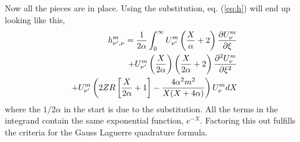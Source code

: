 \documentclass[13pt,a4paper]{article}
\begin{document}
    Now all the pieces are in place. Using the substitution, eq. (\ref{eq:h})
    will end up looking like this,
    \begin{align}
	h_{\nu',\nu}^{m} = \frac{1}{2\alpha}\int_0^{\infty} 
	U_{\nu'}^m
	\left(
	    \frac{X}{\alpha} + 2	
	\right)
	\frac{\partial U_{\nu}^m}{\partial \xi}
	\notag\\
	+
	U_{\nu'}^m
	\left(
	    \frac{X}{2\alpha}	
	\right)	
	\left(
	    \frac{X}{2\alpha} + 2	
	\right)
	\frac{\partial^2 U_{\nu}^m}{\partial \xi^2}
	\\\notag
	+ 
	U_{\nu'}^m
	\left(
	    2 Z R 
	    \left[
		\frac{X}{2\alpha} + 1
	    \right]
	    -
	    \frac{4\alpha^2m^2}{X(X+4\alpha)}
	\right) 
	U_{\nu}^m
	dX
	\label{eq:h_X}
    \end{align}
    where the $1/2\alpha$ in the start is due to the substitution. All the terms
    in the integrand contain the same exponential function, $e^{-X}$. Factoring
    this out fulfills the criteria for the Gauss Laguerre quadrature formula.
    
\end{document}
